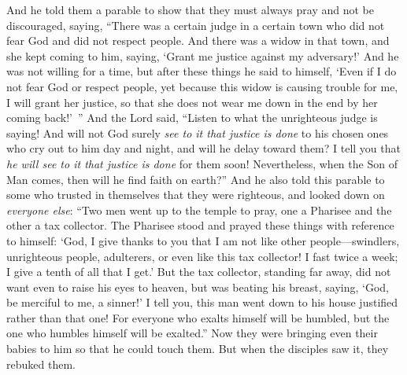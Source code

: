 \begin{biblechapter} %
 And he told them a parable to show that they must always pray and not be discouraged,
\verse saying, “There was a certain judge in a certain town who did not fear God and did not respect people.
\verse And there was a widow in that town, and she kept coming to him, saying, ‘Grant me justice against my adversary!’
\verse And he was not willing for a time, but after these things he said to himself, ‘Even if I do not fear God or respect people,
\verse yet because this widow is causing trouble for me, I will grant her justice, so that she does not wear me down in the end by her coming back!’ ”
\verse And the Lord said, “Listen to what the unrighteous judge is saying!
\verse And will not God surely \textit{see to it that justice is done} to his chosen ones who cry out to him day and night, and will he delay toward them?
\verse I tell you that \textit{he will see to it that justice is done} for them soon! Nevertheless, when the Son of Man comes, then will he find faith on earth?”
 And he also told this parable to some who trusted in themselves that they were righteous, and looked down on \textit{everyone else}:
\verse “Two men went up to the temple to pray, one a Pharisee and the other a tax collector.
\verse The Pharisee stood and prayed these things with reference to himself: ‘God, I give thanks to you that I am not like other people—swindlers, unrighteous people, adulterers, or even like this tax collector!
\verse I fast twice a week; I give a tenth of all that I get.’
\verse But the tax collector, standing far away, did not want even to raise his eyes to heaven, but was beating his breast, saying, ‘God, be merciful to me, a sinner!’
\verse I tell you, this man went down to his house justified rather than that one! For everyone who exalts himself will be humbled, but the one who humbles himself will be exalted.”
 Now they were bringing even their babies to him so that he could touch them. But when the disciples saw it, they rebuked them.

\end{biblechapter}
